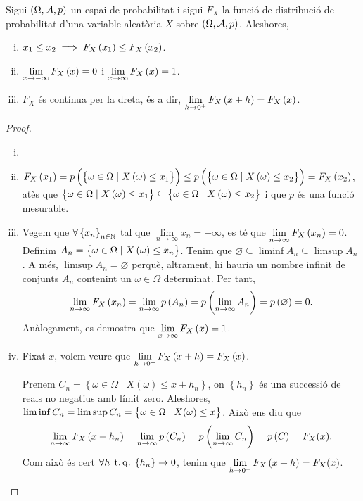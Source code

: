 \begin{prop}
    Sigui $\left(\Omega,\mathcal{A}, p\right)$ un espai de probabilitat i sigui $F_X$ la funció de distribució de probabilitat d'una variable aleatòria $X$ sobre $\left(\Omega,\mathcal{A}, p\right)$. Aleshores,
    \begin{enumerate}[i)]
        \item $x_1\leq x_2\implies F_X\left( x_1\right) \leq F_X\left( x_2\right)$.
        \item $\lim\limits_{x\to-\infty}F_X\left( x\right) = 0$ i $\lim\limits_{x\to\infty}F_X\left( x\right) = 1$.
        \item $F_X$ és contínua per la dreta, és a dir, $\lim\limits_{h\to 0^+}F_X\left( x+h\right) = F_X\left( x\right)$.
    \end{enumerate}
\end{prop}
\begin{proof}
    \begin{enumerate}[i)]
        \item[]
        \item $F_X\left( x_1\right) = p\left(\left\{ \omega\in\Omega\mid X\left(\omega\right)\leq x_1\right\}\right) \leq p\left(\left\{ \omega\in\Omega\mid X\left(\omega\right)\leq x_2\right\}\right) = F_X\left( x_2\right)$, atès que $\left\{ \omega\in\Omega\mid X\left(\omega\right)\leq x_1\right\} \subseteq \left\{ \omega\in\Omega\mid X\left(\omega\right)\leq x_2\right\}$ i que $p$ és una funció mesurable.
        \item Vegem que $\forall\left\{ x_n\right\}_{n\in\mathbb{N}}$ tal que $\lim\limits_{n\to\infty} x_n = -\infty$, es té que $\lim\limits_{n\to\infty}F_X\left( x_n\right) = 0$. Definim $A_n=\left\{\omega\in\Omega\mid X\left(\omega\right)\leq x_n\right\}$. Tenim que $\varnothing\subseteq\liminf A_n\subseteq\limsup A_n$. A més, $\limsup A_n=\varnothing$ perquè, altrament, hi hauria un nombre infinit de conjunts $A_n$ contenint un $\omega\in\Omega$ determinat. Per tant, 
            \[
                \lim\limits_{n\to\infty} F_X\left( x_n\right)=\lim\limits_{n\to\infty} p\left( A_n\right) = p\left(\lim\limits_{n\to\infty} A_n \right) = p\left(\varnothing\right)=0.
            \]
            Anàlogament, es demostra que $\lim\limits_{x\to\infty}F_X\left( x\right) = 1$.
        \item Fixat $x$, volem veure que $\lim\limits_{h \to 0^+} F_X \left( x+h\right) =F_X \left( x\right)$. 
        
        Prenem $C_n=\left\{\omega\in\Omega\mid X(\omega) \leq x + h_n\right\}$,
	 on $\left\{h_n\right\}$ és una successió de reals no negatius amb límit zero. Aleshores, $\liminf C_n =\limsup C_n = \left\{ \omega\in\Omega\mid X(\omega)\leq x\right\}$.
	 Això ens diu que
	 \[
	  \lim\limits_{n\to \infty} F_X\left( x+h_n\right) = \lim\limits_{n\to\infty} p\left( C_n\right) = p\left(\lim\limits_{n\to\infty} C_n \right) = p\left( C\right) =F_X (x).
	 \]
	 Com això és cert $\forall h \operatorname{\;t.q.\;} \left\{ h_n\right\} \to 0$, tenim que $\lim\limits_{h\to 0^+} F_X\left( x+h\right) = F_X (x)$.
    \end{enumerate}
\end{proof}

